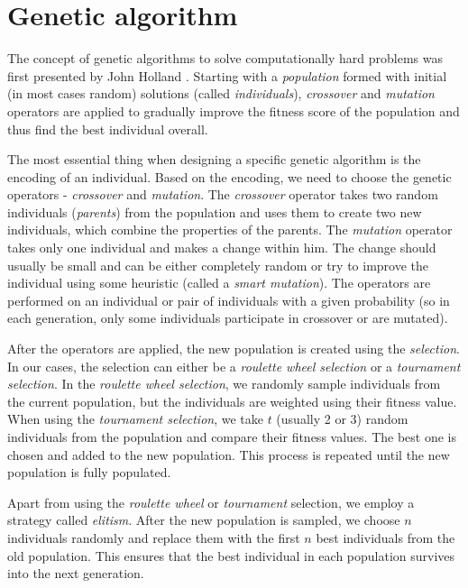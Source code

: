 \chapter{Genetic algorithm}\label{ch:genetic}

The concept of genetic algorithms to solve computationally hard problems was first presented by John Holland \cite{Holland:1992}. Starting with a \textit{population} formed with initial (in most cases random) solutions (called \textit{individuals}), \textit{crossover} and \textit{mutation} operators are applied to gradually improve the fitness score of the population and thus find the best individual overall.

The most essential thing when designing a specific genetic algorithm is the encoding of an individual. Based on the encoding, we need to choose the genetic operators - \textit{crossover} and \textit{mutation}. The \textit{crossover} operator takes two random individuals (\textit{parents}) from the population and uses them to create two new individuals, which combine the properties of the parents. The \textit{mutation} operator takes only one individual and makes a change within him. The change should usually be small and can be either completely random or try to improve the individual using some heuristic (called a \textit{smart mutation}). The operators are performed on an individual or pair of individuals with a given probability (so in each generation, only some individuals participate in crossover or are mutated).

After the operators are applied, the new population is created using the \textit{selection}. In our cases, the selection can either be a \textit{roulette wheel selection} or a \textit{tournament selection}. In the \textit{roulette wheel selection}, we randomly sample individuals from the current population, but the individuals are weighted using their fitness value. When using the \textit{tournament selection}, we take $t$ (usually 2 or 3) random individuals from the population and compare their fitness values. The best one is chosen and added to the new population. This process is repeated until the new population is fully populated.

Apart from using the \textit{roulette wheel} or \textit{tournament} selection, we employ a strategy called \textit{elitism}. After the new population is sampled, we choose $n$ individuals randomly and replace them with the first $n$ best individuals from the old population. This ensures that the best individual in each population survives into the next generation.

